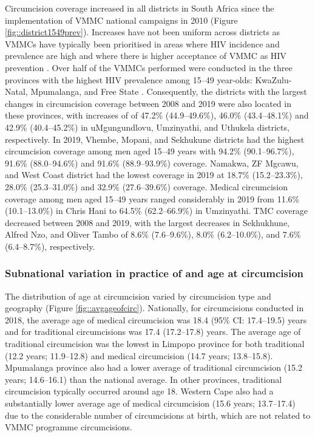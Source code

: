 \documentclass{article}
\begin{document}
Circumcision coverage increased in all districts in South Africa since the implementation of VMMC national campaigns in 2010 (Figure \ref{fig::district1549prev}). Increases have not been uniform across districts as VMMCs have typically been prioritised in areas where HIV incidence and prevalence are high and where there is higher acceptance of VMMC as HIV prevention \autocite{WHOVoluntary2}. Over half of the VMMCs performed were conducted in the three provinces with the highest HIV prevalence among 15--49 year-olds: KwaZulu-Natal, Mpumalanga, and Free State \autocite{hivdata}. Consequently, the districts with the largest changes in circumcision coverage between 2008 and 2019 were also located in these provinces, with increases of of 47.2\% (44.9--49.6\%), 46.0\% (43.4--48.1\%) and 42.9\% (40.4--45.2\%) in uMgungundlovu, Umzinyathi, and Uthukela districts, respectively. In 2019, Vhembe, Mopani, and Sekhukune districts had the highest circumcision coverage among men aged 15--49 years with 94.2\% (90.1--96.7\%), 91.6\% (88.0--94.6\%) and 91.6\% (88.9--93.9\%) coverage. Namakwa, ZF Mgcawu, and West Coast district had the lowest coverage in 2019 at 18.7\% (15.2--23.3\%), 28.0\% (25.3--31.0\%) and 32.9\% (27.6--39.6\%) coverage. Medical circumcision coverage among men aged 15--49 years ranged considerably in 2019 from 11.6\% (10.1--13.0\%) in Chris Hani to 64.5\% (62.2--66.9\%) in Umzinyathi. TMC coverage decreased between 2008 and 2019, with the largest decreases in Sekhukhune, Alfred Nzo, and Oliver Tambo of 8.6\% (7.6--9.6\%), 8.0\% (6.2--10.0\%), and 7.6\% (6.4--8.7\%), respectively.



\subsubsection*{Subnational variation in practice of and age at circumcision}



The distribution of age at circumcision varied by circumcision type and geography (Figure \ref{fig::avgageofcirc}). Nationally, for circumcisions conducted in 2018, the average age of medical circumcision was 18.4 (95\% CI: 17.4--19.5) years and for traditional circumcisions was 17.4 (17.2--17.8) years. The average age of traditional circumcision was the lowest in Limpopo province for both traditional (12.2 years; 11.9--12.8) and medical circumcision (14.7 years; 13.8--15.8). Mpumalanga province also had a lower average of traditional circumcision (15.2 years; 14.6--16.1) than the national average. In other provinces, traditional circumcision typically occurred around age 18. Western Cape also had a substantially lower average age of medical circumcision (15.6 years; 13.7--17.4) due to the considerable number of circumcisions at birth, which are not related to VMMC programme circumcisions.
\end{document}
